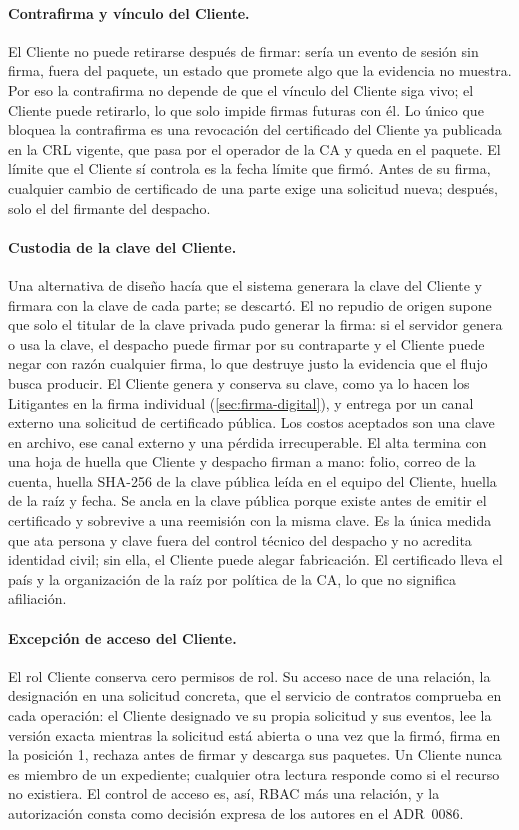 \paragraph{Contrafirma y vínculo del Cliente.} El Cliente no puede retirarse
después de firmar: sería un evento de sesión sin firma, fuera del paquete, un
estado que promete algo que la evidencia no muestra. Por eso la contrafirma no
depende de que el vínculo del Cliente siga vivo; el Cliente puede retirarlo,
lo que solo impide firmas futuras con él. Lo único que bloquea la contrafirma
es una revocación del certificado del Cliente ya publicada en la CRL vigente,
que pasa por el operador de la CA y queda en el paquete. El límite que el
Cliente sí controla es la fecha límite que firmó. Antes de su firma, cualquier
cambio de certificado de una parte exige una solicitud nueva; después, solo el
del firmante del despacho.

\paragraph{Custodia de la clave del Cliente.} Una alternativa de diseño hacía
que el sistema generara la clave del Cliente y firmara con la clave de cada
parte; se descartó. El no repudio de origen supone que solo el titular de la
clave privada pudo generar la firma: si el servidor genera o usa la clave, el
despacho puede firmar por su contraparte y el Cliente puede negar con razón
cualquier firma, lo que destruye justo la evidencia que el flujo busca
producir. El Cliente genera y conserva su clave, como ya lo hacen los
Litigantes en la firma individual (\cref{sec:firma-digital}), y entrega por un
canal externo una solicitud de certificado pública. Los costos aceptados son
una clave en archivo, ese canal externo y una pérdida irrecuperable. El alta
termina con una hoja de huella que Cliente y despacho firman a mano: folio,
correo de la cuenta, huella SHA-256 de la clave pública leída en el equipo del
Cliente, huella de la raíz y fecha. Se ancla en la clave pública porque existe
antes de emitir el certificado y sobrevive a una reemisión con la misma clave.
Es la única medida que ata persona y clave fuera del control técnico del
despacho y no acredita identidad civil; sin ella, el Cliente puede alegar
fabricación. El certificado lleva el país y la organización de la raíz por
política de la CA, lo que no significa afiliación.

\paragraph{Excepción de acceso del Cliente.} El rol Cliente conserva cero
permisos de rol. Su acceso nace de una relación, la designación en una
solicitud concreta, que el servicio de contratos comprueba en cada operación:
el Cliente designado ve su propia solicitud y sus eventos, lee la versión
exacta mientras la solicitud está abierta o una vez que la firmó, firma en la
posición 1, rechaza antes de firmar y descarga sus paquetes. Un Cliente nunca
es miembro de un expediente; cualquier otra lectura responde como si el
recurso no existiera. El control de acceso es, así, RBAC más una relación, y
la autorización consta como decisión expresa de los autores en el ADR~0086.

